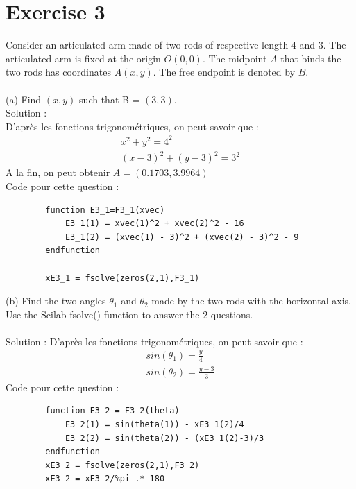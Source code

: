 \documentclass[11pt]{article}
\begin{document}
    \section*{Exercise 3}
    Consider an articulated arm made of two rods of respective length 4 and 3. The articulated arm is fixed at the origin $O(0,0)$. The midpoint $A$ that binds the two rods has coordinates $A(x,y)$. The free endpoint is denoted by $B$.\\
    ~\\
    (a) Find $(x,y)$ such that B = $(3,3)$.\\
    Solution :\\
    D'après les fonctions trigonométriques, on peut savoir que :
    $$
    \begin{matrix}
        x^2+y^2=4^2 \\
        (x-3)^2+(y-3)^2=3^2
    \end{matrix}
    $$
    A la fin, on peut obtenir $A=(0.1703,3.9964)$\\
    Code pour cette question :
    \begin{verbatim}
        function E3_1=F3_1(xvec)
            E3_1(1) = xvec(1)^2 + xvec(2)^2 - 16
            E3_1(2) = (xvec(1) - 3)^2 + (xvec(2) - 3)^2 - 9
        endfunction

        xE3_1 = fsolve(zeros(2,1),F3_1)
    \end{verbatim}
    (b) Find the two angles $\theta_1$ and $\theta_2$ made by the two rods with the horizontal axis. Use the Scilab fsolve() function to answer the 2 questions.\\
    ~\\
    Solution :
    D'après les fonctions trigonométriques, on peut savoir que :
    $$
    \begin{matrix}
        sin(\theta_1) = \frac{y}{4}\\
        sin(\theta_2) = \frac{y-3}{3}
    \end{matrix}
    $$
    Code pour cette question :
    \begin{verbatim}
        function E3_2 = F3_2(theta)
            E3_2(1) = sin(theta(1)) - xE3_1(2)/4
            E3_2(2) = sin(theta(2)) - (xE3_1(2)-3)/3
        endfunction
        xE3_2 = fsolve(zeros(2,1),F3_2)
        xE3_2 = xE3_2/%pi .* 180
    \end{verbatim}
\end{document}
